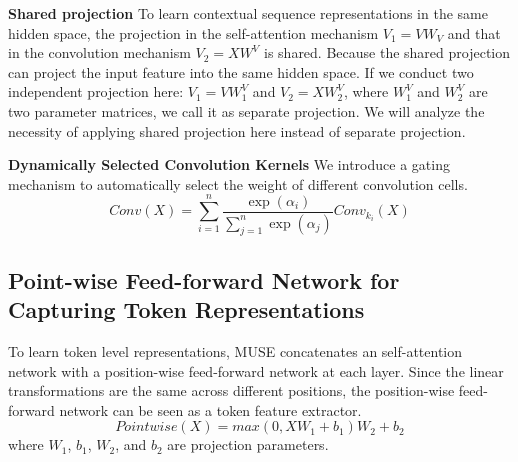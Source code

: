 \documentclass{article} \usepackage{iclr2020_conference,times}
\begin{document}
\textbf{Shared projection}
To learn contextual sequence representations in the same hidden space, the projection in the self-attention mechanism $V_1=VW_V$ and that in the convolution mechanism $V_2=XW^V$ is shared. Because the shared projection can project the input feature into the same hidden space. If we conduct two independent projection here: $V_1=VW_1^V$ and $V_2=XW^V_2$, where $W_1^V$ and $W_2^V$ are two parameter matrices, we call it as separate projection. We will analyze the necessity of applying shared projection here instead of separate projection.

\textbf{Dynamically Selected Convolution Kernels}
 We introduce a gating mechanism to automatically select the weight of different convolution cells. 
\begin{equation}
    Conv(X) = \sum\limits_{i=1}^{n} \frac{\exp{(\alpha_i)} }{\sum\limits_{j=1}^{n}\exp{(\alpha_j)}} {Conv_{k_{i}}(X)}
\end{equation}




\subsection{Point-wise Feed-forward Network for Capturing Token Representations} To learn  token level representations, MUSE concatenates an self-attention network  with a position-wise feed-forward network at each layer.  Since the linear transformations are the same across different positions, the position-wise feed-forward network can be seen as a token feature extractor. \begin{equation} 
Pointwise(X) = max(0, XW_1 + b_1)W_2 + b_2
\end{equation}
where $W_1$, $b_1$, $W_2$, and $b_2$ are projection parameters.
\end{document}
